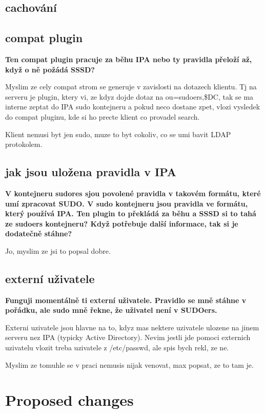 \documentclass[12pt,a4paper,titlepage,final]{article}
\begin{document}
\subsection{cachování}
	
\subsection{compat plugin}
\textbf{Ten compat plugin pracuje za běhu IPA nebo ty pravidla přeloží až, když
o ně požádá SSSD?}

Myslim ze cely compat strom se generuje v zavislosti na dotazech klientu. Tj
na serveru je plugin, ktery vi, ze kdyz dojde dotaz na ou=sudoers,\$DC,
tak se ma interne zeptat do IPA sudo kontejneru a pokud neco dostane zpet,
vlozi vysledek do compat pluginu, kde si ho precte klient co provadel search.

Klient nemusi byt jen sudo, muze to byt cokoliv, co se umi bavit LDAP
protokolem.

\subsection{jak jsou uložena pravidla v IPA}
\textbf{V kontejneru sudores sjou povolené pravidla v takovém formátu, které umí
zpracovat SUDO. V sudo kontejneru jsou pravidla ve formátu, který používá IPA.
Ten plugin to překládá za běhu a SSSD si to tahá ze sudoers kontejneru? Když
potřebuje další informace, tak si je dodatečně stáhne?}

Jo, myslim ze jsi to popsal dobre.

\subsection{externí uživatele}
\textbf{Funguji momentálně ti externí uživatele. Pravidlo se mně
stáhne v pořádku, ale sudo mně řekne, že uživatel není v SUDOers.}

Externi uzivatele jsou hlavne na to, kdyz mas nektere uzivatele
ulozene na jinem serveru nez IPA (typicky Active Directory). Nevim
jestli jde pomoci externich uzivatelu vlozit treba uzivatele z
/etc/passwd, ale spis bych rekl, ze ne.

Myslim ze tomuhle se v praci nemusis nijak venovat, max popsat, ze to tam je.



\section{Proposed changes}
\end{document}
